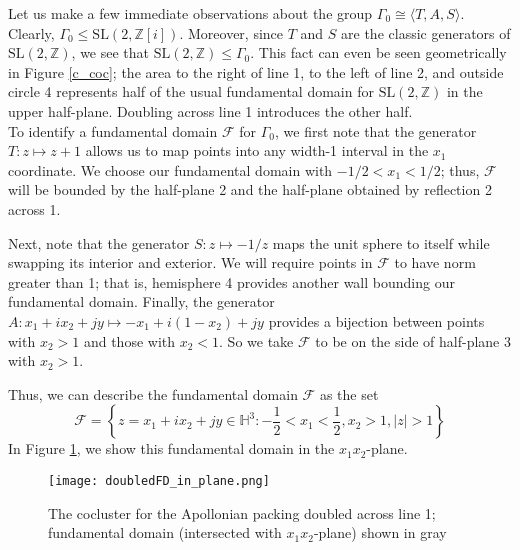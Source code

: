 \documentclass[]{article}
\begin{document}
Let us make a few immediate observations about the group $\Gamma_0 \cong \langle T, A, S \rangle$.
Clearly, $\Gamma_0 \leq \text{SL}(2, \mathbb{Z}[i])$.
Moreover, since $T$ and $S$ are the classic generators of $\text{SL}(2, \mathbb{Z})$, we see that $\text{SL}(2, \mathbb{Z}) \leq \Gamma_0$.
This fact can even be seen geometrically in Figure \ref{c_coc}; the area to the right of line 1, to the left of line 2, and outside circle 4 represents half of the usual fundamental domain for $\text{SL}(2, \mathbb{Z})$ in the upper half-plane.
Doubling across line 1 introduces the other half.
\\

To identify a fundamental domain $\mathcal{F}$ for $\Gamma_0$, we first note that the generator $T: z \mapsto z + 1$ allows us to map points into any width-1 interval in the $x_1$ coordinate.
We choose our fundamental domain with $-1/2 < x_1 < 1/2$; thus, $\mathcal{F}$ will be bounded by the half-plane 2 and the half-plane obtained by reflection 2 across 1.

Next, note that the generator $S : z \mapsto -1/z$ maps the unit sphere to itself while swapping its interior and exterior.
We will require points in $\mathcal{F}$ to have norm greater than 1; that is, hemisphere 4 provides another wall bounding our fundamental domain.
Finally, the generator $A: x_1 + ix_2 + jy \mapsto -x_1 + i(1 - x_2) + jy$ provides a bijection between points with $x_2 > 1$ and those with $x_2 < 1$.
So we take $\mathcal{F}$ to be on the side of half-plane 3 with $x_2 > 1$.

Thus, we can describe the fundamental domain $\mathcal{F}$ as the set
$$
\mathcal{F} = \left\{ z = x_1 + ix_2 + jy \in \mathbb{H}^3 : -\frac{1}{2} < x_1 < \frac{1}{2}, x_2 > 1, |z| > 1 \right\}
$$
In Figure \ref{doubled_coc_2d}, we show this fundamental domain in the $x_1x_2$-plane.
\begin{figure}[h]
	\centering
	\texttt{[image: doubledFD\_in\_plane.png]}
	\caption{The cocluster for the Apollonian packing doubled across line 1; fundamental domain (intersected with $x_1x_2$-plane) shown in gray}
	\label{doubled_coc_2d}
\end{figure}
\\
\end{document}
